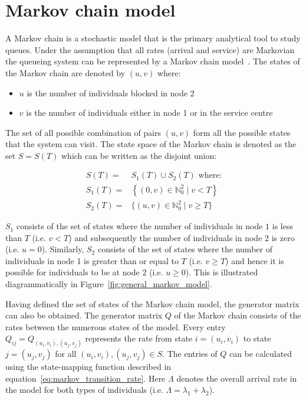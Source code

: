 \section{Markov chain model}\label{sec:markov_model}

A Markov chain is a stochastic model that is the primary analytical tool to
study queues.
Under the assumption that all rates (arrival and service) are Markovian the
queueing system can be represented by a Markov chain
model~\cite{kemeny1976markov}.
The states of the Markov chain are denoted by \((u,v)\) where:

\begin{itemize}
    \item \(u\) is the number of individuals blocked in node 2
    \item \(v\) is the number of individuals either in node 1 or in the
    service centre
\end{itemize}

The set of all possible combination of pairs \((u, v)\) form all the possible
states that the system can visit.
The state space of the Markov chain is denoted as the set \(S=S(T)\) which can
be written as the disjoint union:

\begin{align}
    S(T) =& S_1(T) \cup S_2(T) \text{ where:} \nonumber \\
    S_1(T) =& \left\{(0, v)\in\mathbb{N}_0^2 \; | \; v < T \right\}
    \label{eq:definition_of_S_as_disjoint_union} \\
    S_2(T) =& \{(u, v)\in\mathbb{N}_0^2 \; | \; v \geq T \} \nonumber
\end{align}

\(S_1\) consists of the set of states where the number of individuals in node
\(1\) is less than \(T\) (i.e. \(v < T\)) and subsequently the number of
individuals in node \(2\) is zero (i.e. \(u = 0\)).
Similarly, \(S_2\) consists of the set of states where the number of individuals
in node 1 is greater than or equal to \(T\) (i.e. \(v \geq T\)) and
hence it is possible for individuals to be at node 2 (i.e.
\(u \geq 0\)).
This is illustrated diagrammatically in Figure~\ref{fig:general_markov_model}.

Having defined the set of states of the Markov chain model, the generator
matrix can also be obtained.
The generator matrix \(Q\) of the Markov chain consists of the
rates between the numerous states of the model.
Every entry \( Q_{ij} = Q_{(u_i, v_i),(u_j, v_j)} \) represents the rate from
state \( i = (u_i, v_i) \) to state \( j = (u_j , v_j) \) for all
\( (u_i, v_i), (u_j, v_j) \in S \).
The entries of \(Q\) can be calculated using the state-mapping function
described in equation~\eqref{eq:markov_transition_rate}.
Here \(\Lambda\) denotes the overall arrival rate in the model for
both types of individuals (i.e. \(\Lambda = \lambda_1 + \lambda_2\)).

